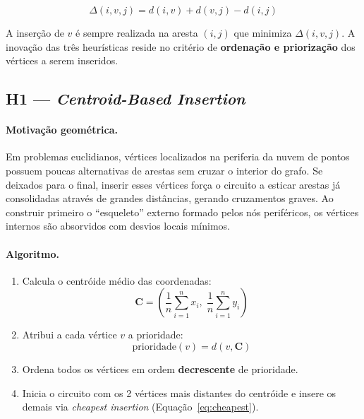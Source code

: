 \documentclass[12pt, a4paper]{article}
\begin{document}
\begin{equation}
    \Delta(i, v, j) = d(i,v) + d(v,j) - d(i,j)
    \label{eq:cheapest}
\end{equation}

A inserção de $v$ é sempre realizada na aresta $(i,j)$ que minimiza
$\Delta(i,v,j)$. A inovação das três heurísticas reside no critério de
\textbf{ordenação e priorização} dos vértices a serem inseridos.

\subsection{H1 --- \textit{Centroid-Based Insertion}}

\paragraph{Motivação geométrica.}
Em problemas euclidianos, vértices localizados na periferia da nuvem de pontos possuem
poucas alternativas de arestas sem cruzar o interior do grafo. Se deixados para o final,
inserir esses vértices força o circuito a esticar arestas já consolidadas através de
grandes distâncias, gerando cruzamentos graves. Ao construir primeiro o ``esqueleto''
externo formado pelos nós periféricos, os vértices internos são absorvidos com desvios
locais mínimos.

\paragraph{Algoritmo.}
\begin{enumerate}
    \item Calcula o centróide médio das coordenadas:
          \begin{equation}
              \mathbf{C} = \left(\frac{1}{n}\sum_{i=1}^n x_i,\;
                                  \frac{1}{n}\sum_{i=1}^n y_i\right)
          \end{equation}
    \item Atribui a cada vértice $v$ a prioridade:
          \begin{equation}
              \mathrm{prioridade}(v) = d(v, \mathbf{C})
          \end{equation}
    \item Ordena todos os vértices em ordem \textbf{decrescente} de prioridade.
    \item Inicia o circuito com os 2 vértices mais distantes do centróide e insere os
          demais via \textit{cheapest insertion} (Equação~\ref{eq:cheapest}).
\end{enumerate}
\end{document}
